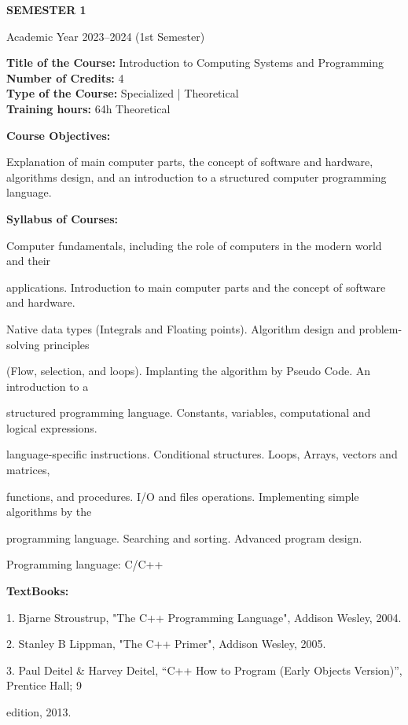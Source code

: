\documentclass[12pt,a4paper]{article}
\begin{document}
\newpage
\vspace*{\fill}
\begin{center}
  {\fontsize{28pt}{34pt}\selectfont \textbf{SEMESTER 1}}\par\vspace{12pt}
  {\fontsize{13pt}{17pt}\selectfont Academic Year 2023–2024 (1st Semester)}
\end{center}
\vspace*{\fill}

\newpage
\textbf{Title of the Course:} Introduction to Computing Systems and Programming\\
\textbf{Number of Credits:} 4\\
\textbf{Type of the Course:} Specialized | Theoretical\\
\textbf{Training hours:} 64h Theoretical\par\vspace{4pt}
\textbf{Course Objectives:}\par\vspace{2pt}
Explanation of main computer parts, the concept of software and hardware, algorithms design, and
an introduction to a structured computer programming language.\par\vspace{4pt}
\textbf{Syllabus of Courses:}\par\vspace{2pt}
Computer fundamentals, including the role of computers in the modern world and their\par
applications. Introduction to main computer parts and the concept of software and hardware.\par
Native data types (Integrals and Floating points). Algorithm design and problem-solving principles\par
(Flow, selection, and loops). Implanting the algorithm by Pseudo Code. An introduction to a\par
structured programming language. Constants, variables, computational and logical expressions.\par
language-specific instructions. Conditional structures. Loops, Arrays, vectors and matrices,\par
functions, and procedures. I/O and files operations. Implementing simple algorithms by the\par
programming language. Searching and sorting. Advanced program design.\par
Programming language: C/C++\par\vspace{4pt}
\textbf{TextBooks:}\par\vspace{2pt}
1. Bjarne Stroustrup, "The C++ Programming Language", Addison Wesley, 2004.\par
2. Stanley B Lippman, "The C++ Primer", Addison Wesley, 2005.\par
3. Paul Deitel \& Harvey Deitel, “C++ How to Program (Early Objects Version)”, Prentice Hall; 9\par
edition, 2013.\par
\vspace{4pt}
\end{document}
